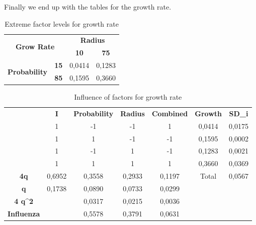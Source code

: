 Finally we end up with the tables for the growth rate.

\begin{table}[H]
\centering
\begin{tabular}{|cc|cc|}
\hline
\multicolumn{2}{|c|}{\multirow{2}{*}{\textbf{Grow Rate}}} & \multicolumn{2}{c|}{\textbf{Radius}} \\ \cline{3-4} 
\multicolumn{2}{|c|}{} & \multicolumn{1}{c|}{\textbf{10}} & \textbf{75} \\ \hline
\multicolumn{1}{|c|}{\multirow{2}{*}{\textbf{Probability}}} & \textbf{15} & \multicolumn{1}{c|}{0,0414} & 0,1283 \\ \cline{2-4} 
\multicolumn{1}{|c|}{} & \textbf{85} & \multicolumn{1}{c|}{0,1595} & 0,3660 \\ \hline
\end{tabular}
\caption{Extreme factor levels for growth rate}
\end{table}


\begin{table}[H]
\centering
\begin{tabular}{c|c|c|c|c|cc}
\cline{2-7}
 & \textbf{I} & \textbf{Probability} & \textbf{Radius} & \textbf{Combined} & \multicolumn{1}{c|}{\textbf{Growth}} & \multicolumn{1}{c|}{\textbf{SD\_i}} \\ \cline{2-7} 
 & 1 & -1 & -1 & 1 & \multicolumn{1}{c|}{0,0414} & \multicolumn{1}{c|}{0,0175} \\ \cline{2-7} 
 & 1 & 1 & -1 & -1 & \multicolumn{1}{c|}{0,1595} & \multicolumn{1}{c|}{0,0002} \\ \cline{2-7} 
 & 1 & -1 & 1 & -1 & \multicolumn{1}{c|}{0,1283} & \multicolumn{1}{c|}{0,0021} \\ \cline{2-7} 
 & 1 & 1 & 1 & 1 & \multicolumn{1}{c|}{0,3660} & \multicolumn{1}{c|}{0,0369} \\ \hline
\multicolumn{1}{|c|}{\textbf{4q}} & 0,6952 & 0,3558 & 0,2933 & 0,1197 & \multicolumn{1}{c|}{Total} & \multicolumn{1}{c|}{0,0567} \\ \hline
\multicolumn{1}{|c|}{\textbf{q}} & 0,1738 & 0,0890 & 0,0733 & 0,0299 &  &  \\ \cline{1-5}
\multicolumn{1}{|c|}{\textbf{4 q\textasciicircum{}2}} &  & 0,0317 & 0,0215 & 0,0036 &  &  \\ \cline{1-5}
\multicolumn{1}{|c|}{\textbf{Influenza}} &  & 0,5578 & 0,3791 & 0,0631 &  &  \\ \cline{1-5}
\end{tabular}
\caption{Influence of factors for growth rate}
\end{table}



